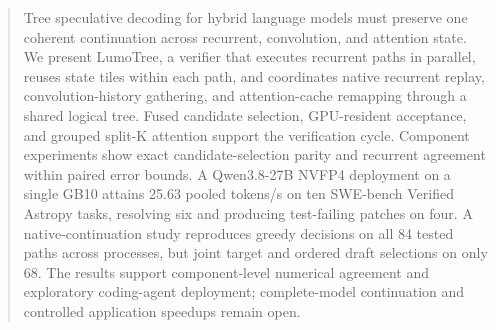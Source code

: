 \begin{abstract}
Tree speculative decoding for hybrid language models must preserve one coherent continuation across recurrent, convolution, and attention state. We present LumoTree, a verifier that executes recurrent paths in parallel, reuses state tiles within each path, and coordinates native recurrent replay, convolution-history gathering, and attention-cache remapping through a shared logical tree. Fused candidate selection, GPU-resident acceptance, and grouped split-K attention support the verification cycle. Component experiments show exact candidate-selection parity and recurrent agreement within paired error bounds. A Qwen3.8-27B NVFP4 deployment on a single GB10 attains 25.63 pooled tokens/s on ten SWE-bench Verified Astropy tasks, resolving six and producing test-failing patches on four. A native-continuation study reproduces greedy decisions on all 84 tested paths across processes, but joint target and ordered draft selections on only 68. The results support component-level numerical agreement and exploratory coding-agent deployment; complete-model continuation and controlled application speedups remain open.
\end{abstract}
